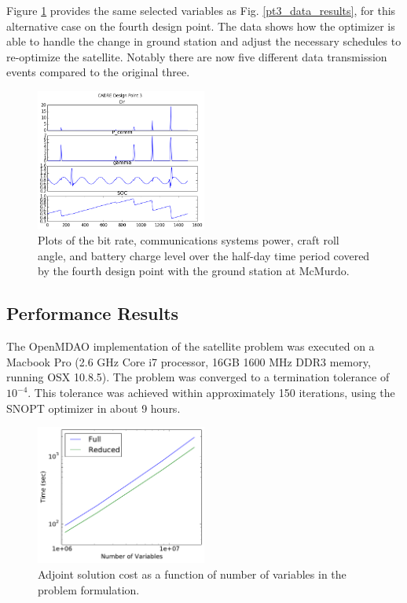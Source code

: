 \documentclass[]{aiaa-tc} %
\begin{document}
        Figure \ref{fig:pt3_results_mcmurdo} provides the same selected variables as Fig. \ref{pt3_data_results},
        for this alternative case on the fourth design point. The data shows how the optimizer is
        able to handle the change in ground station and adjust the necessary schedules to re-optimize the
        satellite. Notably there are now five different data transmission events compared to the original three.


        \begin{figure}[!htbp]
            \centering
            \includegraphics[width=0.5\textwidth]{images/cadre_results_mcmurdo}
            \caption{Plots of the bit rate, communications systems power, craft roll angle,
        and battery charge level over the half-day time period covered by the fourth design point
        with the ground station at McMurdo. }
            \label{fig:pt3_results_mcmurdo}
        \end{figure}


        \subsection{Performance Results}

            The OpenMDAO implementation of the satellite problem was executed on a
            Macbook Pro (2.6 GHz Core i7 processor, 16GB 1600 MHz DDR3 memory, running OSX 10.8.5).
            The problem was converged to a termination tolerance of $10^{-4}$. This tolerance
            was achieved within approximately 150 iterations, using the SNOPT\cite{gill2005snopt}
            optimizer in about 9 hours.

            \begin{figure}[!htbp]
                \centering
                \includegraphics[width=0.5\textwidth]{images/cadre_var_scaling}
                \caption{Adjoint solution cost as a function of number of variables in the problem formulation.}
                \label{fig:cadre-compute-cost}
            \end{figure}
\end{document}
